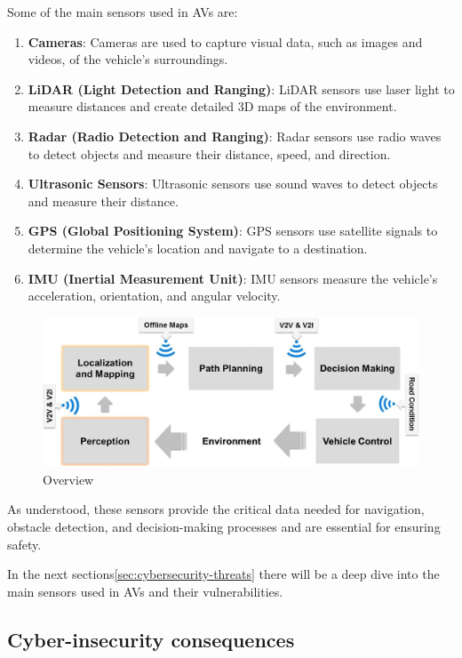Some of the main sensors used in AVs are:
\begin{enumerate}
    \item \textbf{Cameras}: Cameras are used to capture visual data, such as images and videos, of the vehicle's surroundings.
    \item \textbf{LiDAR (Light Detection and Ranging)}: LiDAR sensors use laser light to measure distances and create detailed 3D maps of the environment.
    \item \textbf{Radar (Radio Detection and Ranging)}: Radar sensors use radio waves to detect objects and measure their distance, speed, and direction.
    \item \textbf{Ultrasonic Sensors}: Ultrasonic sensors use sound waves to detect objects and measure their distance.
    \item \textbf{GPS (Global Positioning System)}: GPS sensors use satellite signals to determine the vehicle's location and navigate to a destination.
    \item \textbf{IMU (Inertial Measurement Unit)}: IMU sensors measure the vehicle's acceleration, orientation, and angular velocity.
\end{enumerate}

\begin{figure}[!htb]
    \centering
    \includegraphics[width=0.7\linewidth]{figures/perception}
    \caption{Overview}
    \label{fig:sensors}
\end{figure}

As understood, these sensors provide the critical data needed for navigation, obstacle
detection, and decision-making processes and are essential for ensuring safety\cite{unknown2020connected,cybersec}.

In the next sections\ref{sec:cybersecurity-threats} there will be a deep dive into the main sensors used in AVs and their vulnerabilities.

\subsection{Cyber-insecurity consequences}\label{subsec:cyber-insecurity}

